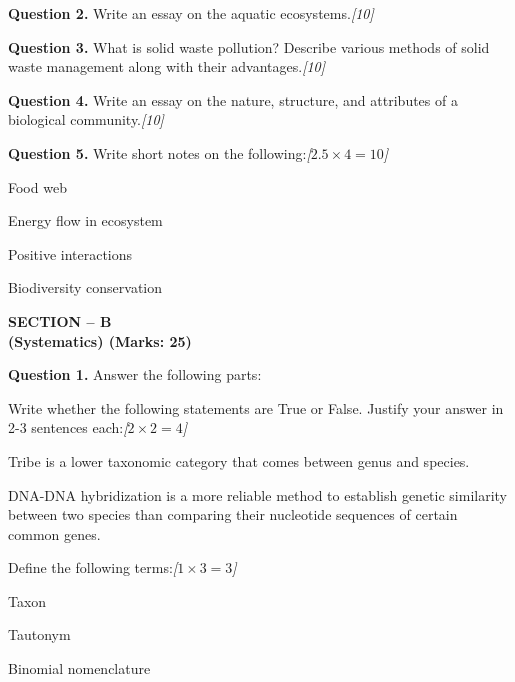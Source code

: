 \documentclass[11pt,a4paper]{article}
\newcommand{\pts}[1]{\hfill   \textit{[#1]}}
\begin{document}
\medskip


\noindent   \textbf{Question 2.} Write an essay on the aquatic ecosystems.\pts{10}

\medskip


\noindent   \textbf{Question 3.} What is solid waste pollution? Describe various methods of solid waste management along with their advantages.\pts{10}

\medskip


\noindent   \textbf{Question 4.} Write an essay on the nature, structure, and attributes of a biological community.\pts{10}

\medskip


\noindent   \textbf{Question 5.} Write short notes on the following:\pts{$2.5  \times 4 = 10$}

\begin{parts}
  \item Food web
  \item Energy flow in ecosystem
  \item Positive interactions
  \item Biodiversity conservation
\end{parts}

\pagebreak

\begin{center}
   \textbf{SECTION -- B} \\
   \textbf{(Systematics) (Marks: 25)}
\end{center}

\medskip


\noindent   \textbf{Question 1.} Answer the following parts:

\begin{parts}
  \item Write whether the following statements are True or False. Justify your answer in 2-3 sentences each:\pts{$2  \times 2 = 4$}
  
\begin{parts}
    \item Tribe is a lower taxonomic category that comes between genus and species.
    \item DNA-DNA hybridization is a more reliable method to establish genetic similarity between two species than comparing their nucleotide sequences of certain common genes.
  \end{parts}
  
  \item Define the following terms:\pts{$1  \times 3 = 3$}
  
\begin{parts}
    \item Taxon
    \item Tautonym
    \item Binomial nomenclature
  \end{parts}
\end{parts}
\end{document}
